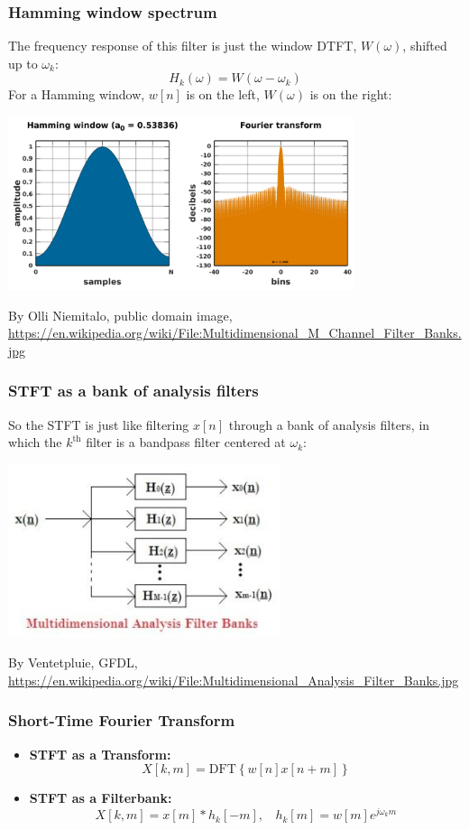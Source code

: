 \documentclass{beamer}
\begin{document}
\begin{frame}
  \frametitle{Hamming window spectrum}

  The frequency response of this filter is just the window DTFT,
  $W(\omega)$, shifted up to $\omega_k$:
  \[
  H_k(\omega) = W\left(\omega-\omega_k\right)
  \]
  For a Hamming window, $w[n]$ is on the left, $W(\omega)$ is on the right:
  \centerline{\includegraphics[height=2in]{Hamming_spectrum.png}}
  \begin{tiny}
    By Olli Niemitalo, public domain image,
    \url{https://en.wikipedia.org/wiki/File:Multidimensional_M_Channel_Filter_Banks.jpg}
  \end{tiny}
\end{frame}
  
\begin{frame}
  \frametitle{STFT as a bank of analysis filters}

  So the STFT is just like filtering $x[n]$ through a bank of analysis
  filters, in which the $k^{\textrm{th}}$ filter is a bandpass filter
  centered at $\omega_k$:
  \centerline{\includegraphics[height=2in]{Analysis_Filter_Banks.jpg}}
  \begin{tiny}
    By Ventetpluie, GFDL,
    \url{https://en.wikipedia.org/wiki/File:Multidimensional_Analysis_Filter_Banks.jpg}
  \end{tiny}
\end{frame}

\begin{frame}
  \frametitle{Short-Time Fourier Transform}
  \begin{itemize}
  \item {\bf STFT as a Transform:}
    \[
    X[k,m] = \mbox{DFT}\left\{w[n]x[n+m]\right\}
    \]
  \item {\bf STFT as a Filterbank:}
    \[
    X[k,m] = x[m] \ast h_k[-m],~~~~h_k[m] = w[m]e^{j\omega_k m}
    \]
  \end{itemize}
\end{frame}
\end{document}
